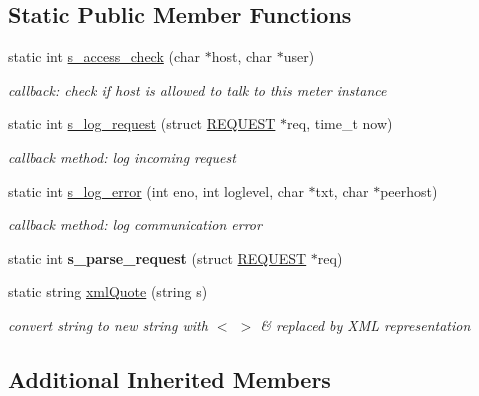 \subsection*{Static Public Member Functions}
\begin{DoxyCompactItemize}
\item 
static int \hyperlink{classCtrlComm_a240b7eae0b93c38199b860693bfdee07}{s\+\_\+access\+\_\+check} (char $\ast$host, char $\ast$user)
\begin{DoxyCompactList}\small\item\em callback\+: check if host is allowed to talk to this meter instance \end{DoxyCompactList}\item 
\mbox{\label{classCtrlComm_ad026f62d977a42848e04362a636ab9f1}} 
static int \hyperlink{classCtrlComm_ad026f62d977a42848e04362a636ab9f1}{s\+\_\+log\+\_\+request} (struct \hyperlink{structREQUEST}{R\+E\+Q\+U\+E\+ST} $\ast$req, time\+\_\+t now)
\begin{DoxyCompactList}\small\item\em callback method\+: log incoming request \end{DoxyCompactList}\item 
\mbox{\label{classCtrlComm_a608fc689ad9dc6262bb1208de956e90d}} 
static int \hyperlink{classCtrlComm_a608fc689ad9dc6262bb1208de956e90d}{s\+\_\+log\+\_\+error} (int eno, int loglevel, char $\ast$txt, char $\ast$peerhost)
\begin{DoxyCompactList}\small\item\em callback method\+: log communication error \end{DoxyCompactList}\item 
\mbox{\label{classCtrlComm_acbb6f0eed124c17de400b895119c33dd}} 
static int {\bfseries s\+\_\+parse\+\_\+request} (struct \hyperlink{structREQUEST}{R\+E\+Q\+U\+E\+ST} $\ast$req)
\item 
static string \hyperlink{classCtrlComm_a90fc85f6b20a5fd41f70049efdb4ac7a}{xml\+Quote} (string s)
\begin{DoxyCompactList}\small\item\em convert string to new string with $<$ $>$ \& replaced by X\+ML representation \end{DoxyCompactList}\end{DoxyCompactItemize}
\subsection*{Additional Inherited Members}


